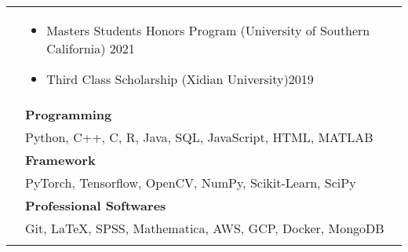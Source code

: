 \documentclass[letterpaper, 11pt]{article}
\begin{document}
\begin{longtable}{p{1.3in}p{4.8in}}

\newline
\nohyphens{{\color{black}{Honors and scholarships}}} 
&  \begin{itemize}[leftmargin=10pt, itemsep=-5pt, topsep=0pt]
    \item Masters Students Honors Program (University of Southern California) \hfill 2021
    \item Third Class Scholarship (Xidian University)\hfill 2019 
  \end{itemize}\\ 



{\color{black}{Skills}} 
& \textbf{Programming}\\
& Python, C++, C, R, Java, SQL, JavaScript, HTML, MATLAB \\
& \textbf{Framework} \\
& PyTorch, Tensorflow, OpenCV, NumPy, Scikit-Learn, SciPy \\
& \textbf{Professional Softwares} \\
& Git, LaTeX, SPSS, Mathematica, AWS, GCP, Docker, MongoDB \\
& \\



\end{longtable}
\end{document}
